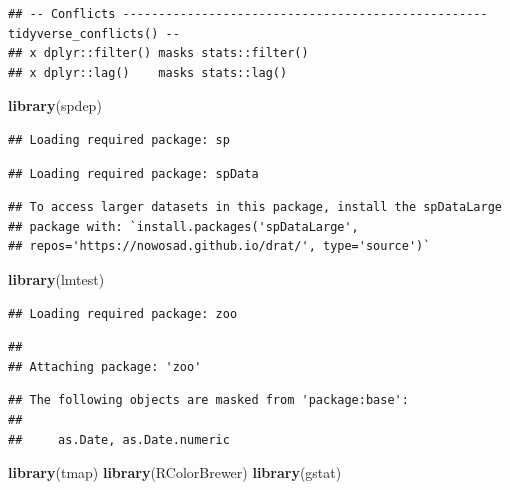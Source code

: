 \documentclass[11pt,]{article}
\newenvironment{Shaded}{\begin{snugshade}}{\end{snugshade}}
\newcommand{\KeywordTok}[1]{\textcolor[rgb]{0.13,0.29,0.53}{\textbf{#1}}}
\newcommand{\NormalTok}[1]{#1}
\begin{document}
\begin{verbatim}
## -- Conflicts --------------------------------------------------- tidyverse_conflicts() --
## x dplyr::filter() masks stats::filter()
## x dplyr::lag()    masks stats::lag()
\end{verbatim}

\begin{Shaded}
\begin{Highlighting}[]
\KeywordTok{library}\NormalTok{(spdep)}
\end{Highlighting}
\end{Shaded}

\begin{verbatim}
## Loading required package: sp
\end{verbatim}

\begin{verbatim}
## Loading required package: spData
\end{verbatim}

\begin{verbatim}
## To access larger datasets in this package, install the spDataLarge
## package with: `install.packages('spDataLarge',
## repos='https://nowosad.github.io/drat/', type='source')`
\end{verbatim}

\begin{Shaded}
\begin{Highlighting}[]
\KeywordTok{library}\NormalTok{(lmtest)}
\end{Highlighting}
\end{Shaded}

\begin{verbatim}
## Loading required package: zoo
\end{verbatim}

\begin{verbatim}
## 
## Attaching package: 'zoo'
\end{verbatim}

\begin{verbatim}
## The following objects are masked from 'package:base':
## 
##     as.Date, as.Date.numeric
\end{verbatim}

\begin{Shaded}
\begin{Highlighting}[]
\KeywordTok{library}\NormalTok{(tmap)}
\KeywordTok{library}\NormalTok{(RColorBrewer)}
\KeywordTok{library}\NormalTok{(gstat)}
\end{Highlighting}
\end{Shaded}
\end{document}

